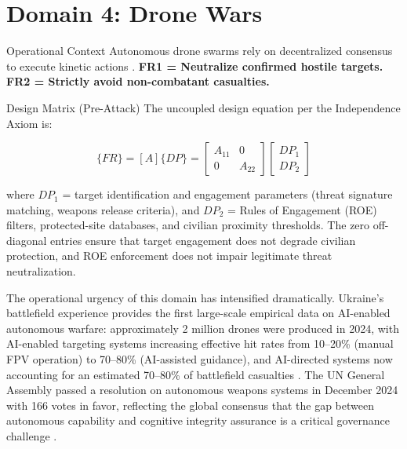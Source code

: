 \documentclass[
  ignorenonframetext,
]{beamer}
\author{\texorpdfstring{}{}}
\date{}
\begin{document}
\section{Domain 4: Drone Wars}\label{sec:domain_drone_wars}

\begin{frame}[allowframebreaks]{Operational Context}
\protect{}\label{operational-context}
Autonomous drone swarms rely on decentralized consensus to execute
kinetic actions \cite{scharre2018army}. \textbf{FR1 = Neutralize
confirmed hostile targets.} \textbf{FR2 = Strictly avoid non-combatant
casualties.}

\begin{block}{Design Matrix (Pre-Attack)}
\protect{}\label{design-matrix-pre-attack}
The uncoupled design equation per the Independence Axiom
\cite{suh2001axiomatic} is:

\begin{equation}
\{FR\} = [A]\{DP\} = \begin{bmatrix} A_{11} & 0 \\ 0 & A_{22} \end{bmatrix} \begin{bmatrix} DP_1 \\ DP_2 \end{bmatrix}
\label{eq:drone_wars_baseline}
\end{equation}

where \(DP_1\) = target identification and engagement parameters (threat
signature matching, weapons release criteria), and \(DP_2\) = Rules of
Engagement (ROE) filters, protected-site databases, and civilian
proximity thresholds. The zero off-diagonal entries ensure that target
engagement does not degrade civilian protection, and ROE enforcement
does not impair legitimate threat neutralization.

The operational urgency of this domain has intensified dramatically.
Ukraine's battlefield experience provides the first large-scale
empirical data on AI-enabled autonomous warfare: approximately 2 million
drones were produced in 2024, with AI-enabled targeting systems
increasing effective hit rates from 10--20\% (manual FPV operation) to
70--80\% (AI-assisted guidance), and AI-directed systems now accounting
for an estimated 70--80\% of battlefield casualties
\cite{bondar2025ukraine}. The UN General Assembly passed a resolution on
autonomous weapons systems in December 2024 with 166 votes in favor,
reflecting the global consensus that the gap between autonomous
capability and cognitive integrity assurance is a critical governance
challenge \cite{king2024robotwars}.
\end{block}
\end{frame}
\end{document}
